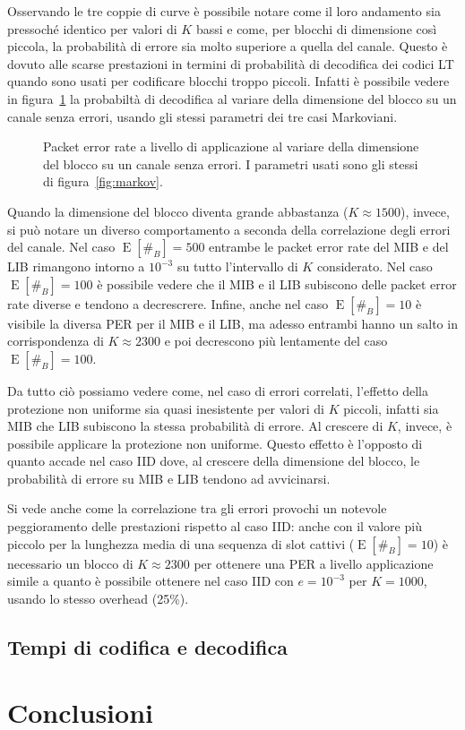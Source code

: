 \documentclass[italian, a4paper, 12pt]{article}
\newcommand{\E}[1]{\operatorname{E}\left[#1\right]}
\newcommand{\EnB}{\E{\#_B}}
\begin{document}
Osservando le tre coppie di curve è possibile notare come il loro
andamento sia pressoché identico per valori di $K$ bassi e come, per
blocchi di dimensione così piccola, la probabilità di errore sia molto
superiore a quella del canale.
%
Questo è dovuto alle scarse prestazioni in termini di probabilità di
decodifica dei codici LT quando sono usati per codificare blocchi
troppo piccoli.
%
Infatti è possibile vedere in figura~\ref{fig:noerrk} la probabiltà di
decodifica al variare della dimensione del blocco su un canale senza
errori, usando gli stessi parametri dei tre casi Markoviani.
%
\begin{figure}[htb]
  \centering
  \caption{Packet error rate a livello di applicazione al variare
    della dimensione del blocco su un canale senza errori. I parametri
    usati sono gli stessi di figura~\ref{fig:markov}.}
  \label{fig:noerrk}
\end{figure}

Quando la dimensione del blocco diventa grande abbastanza ($K \approx
1500$), invece, si può notare un diverso comportamento a seconda della
correlazione degli errori del canale.
%
Nel caso $\EnB = 500$ entrambe le packet error rate del MIB e del LIB
rimangono intorno a $10^{-3}$ su tutto l'intervallo di $K$
considerato. Nel caso $\EnB = 100$ è possibile vedere che il MIB e il
LIB subiscono delle packet error rate diverse e tendono a
decrescrere. Infine, anche nel caso $\EnB = 10$ è visibile la diversa
PER per il MIB e il LIB, ma adesso entrambi hanno un salto in
corrispondenza di $K \approx 2300$ e poi decrescono più lentamente del
caso $\EnB = 100$.

Da tutto ciò possiamo vedere come, nel caso di errori correlati,
l'effetto della protezione non uniforme sia quasi inesistente per
valori di $K$ piccoli, infatti sia MIB che LIB subiscono la stessa
probabilità di errore. Al crescere di $K$, invece, è possibile
applicare la protezione non uniforme.
%
Questo effetto è l'opposto di quanto accade nel caso IID \cite{uep}
dove, al crescere della dimensione del blocco, le probabilità di
errore su MIB e LIB tendono ad avvicinarsi.

Si vede anche come la correlazione tra gli errori provochi un notevole
peggioramento delle prestazioni rispetto al caso IID: anche con il
valore più piccolo per la lunghezza media di una sequenza di slot
cattivi ($\EnB = 10$) è necessario un blocco di $K\approx 2300$ per
ottenere una PER a livello applicazione simile a quanto è possibile
ottenere nel caso IID con $e=10^{-3}$ per $K=1000$, usando lo stesso
overhead (25\%).

\subsection{Tempi di codifica e decodifica}


\section{Conclusioni}


\printbibliography[heading=bibnumbered, title=Bibliografia]
\end{document}
